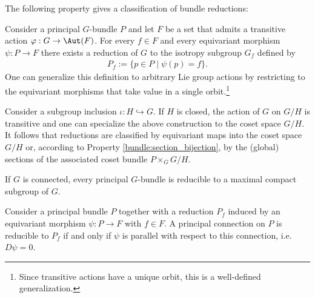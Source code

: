     The following property gives a classification of bundle reductions:
    \begin{property}\label{bundle:reduction_classification}
        Consider a principal $G$-bundle $P$ and let $F$ be a set that admits a transitive action $\varphi:G\rightarrow\Aut(F)$. For every $f\in F$ and every equivariant morphism $\psi:P\rightarrow F$ there exists a reduction of $G$ to the isotropy subgroup $G_f$ defined by
        \begin{gather}
            P_f := \{p\in P\mid\psi(p) = f\}.
        \end{gather}
        One can generalize this definition to arbitrary Lie group actions by restricting to the equivariant morphisms that take value in a single orbit.\footnote{Since transitive actions have a unique orbit, this is a well-defined generalization.}

        Consider a subgroup inclusion $\iota:H\hookrightarrow G$. If $H$ is closed, the action of $G$ on $G/H$ is transitive and one can specialize the above construction to the coset space $G/H$. It follows that reductions are classified by equivariant maps into the coset space $G/H$ or, according to Property \ref{bundle:section_bijection}, by the (global) sections of the associated coset bundle $P\times_GG/H$.
    \end{property}
    \begin{result}
        If $G$ is connected, every principal $G$-bundle is reducible to a maximal compact subgroup of $G$.
    \end{result}

    \begin{property}\label{bundle:connection_reducibility}
        Consider a principal bundle $P$ together with a reduction $P_f$ induced by an equivariant morphism $\psi:P\rightarrow F$ with $f\in F$. A principal connection on $P$ is reducible to $P_f$ if and only if $\psi$ is parallel with respect to this connection, i.e. $D\psi = 0$.
    \end{property}

